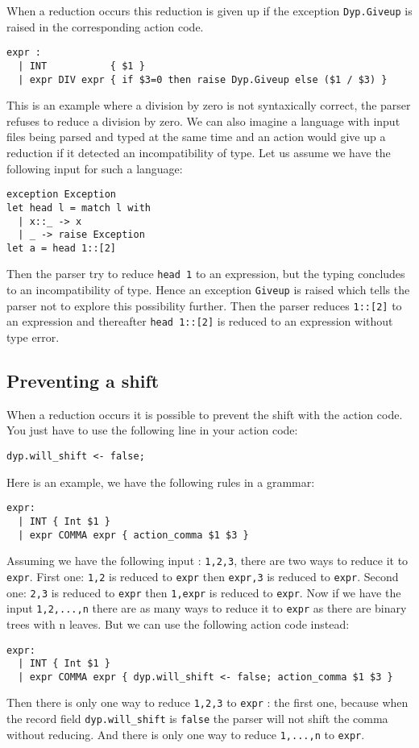\documentclass[12pt]{article}
\begin{document}
{When a reduction occurs this reduction is given up if the exception \texttt{Dyp.Giveup} is raised in the corresponding action code.
\begin{verbatim}
expr :
  | INT           { $1 }
  | expr DIV expr { if $3=0 then raise Dyp.Giveup else ($1 / $3) }
\end{verbatim}
This is an example where a division by zero is not syntaxically correct, the parser refuses to reduce a division by zero. We can also imagine a language with input files being parsed and typed at the same time and an action would give up a reduction if it detected an incompatibility of type. Let us assume we have the following input for such a language:
\begin{verbatim}
exception Exception
let head l = match l with
  | x::_ -> x
  | _ -> raise Exception
let a = head 1::[2]
\end{verbatim}
Then the parser try to reduce \texttt{head 1} to an expression, but the typing concludes to an incompatibility of type. Hence an exception \texttt{Giveup} is raised which tells the parser not to explore this possibility further. Then the parser reduces \texttt{1::[2]} to an expression and thereafter \texttt{head 1::[2]} is reduced to an expression without type error.

\subsection{Preventing a shift}

When a reduction occurs it is possible to prevent the shift with the action code. You just have to use the following line in your action code:
\begin{verbatim}
dyp.will_shift <- false;
\end{verbatim}

Here is an example, we have the following rules in a grammar:
\begin{verbatim}
expr:
  | INT { Int $1 }
  | expr COMMA expr { action_comma $1 $3 }
\end{verbatim}
Assuming we have the following input : \texttt{1,2,3}, there are two ways to reduce it to \texttt{expr}. First one: \texttt{1,2} is reduced to \texttt{expr} then \texttt{expr,3} is reduced to \texttt{expr}. Second one: \texttt{2,3} is reduced to \texttt{expr} then \texttt{1,expr} is reduced to \texttt{expr}. Now if we have the input \texttt{1,2,...,n} there are as many ways to reduce it to \texttt{expr} as there are binary trees with n leaves. But we can use the following action code instead:
\begin{verbatim}
expr:
  | INT { Int $1 }
  | expr COMMA expr { dyp.will_shift <- false; action_comma $1 $3 }
\end{verbatim}
Then there is only one way to reduce \texttt{1,2,3} to \texttt{expr} : the first one, because when the record field \texttt{dyp.will\_shift} is \texttt{false} the parser will not shift the comma without reducing. And there is only one way to reduce \texttt{1,...,n} to \texttt{expr}.

}
\end{document}
